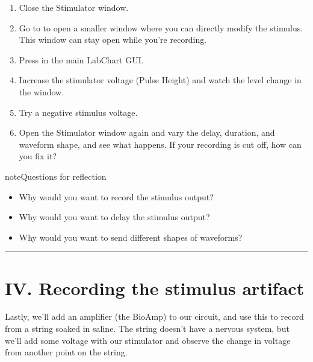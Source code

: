 \documentclass[letterpaper,10pt,english]{jupyterBook}
\begin{document}
\begin{enumerate}
\item {} 
\sphinxAtStartPar
Close the Stimulator window.

\item {} 
\sphinxAtStartPar
Go to  to open a smaller window where you can directly modify the stimulus. This window can stay open while you’re recording.

\item {} 
\sphinxAtStartPar
Press  in the main LabChart GUI.

\item {} 
\sphinxAtStartPar
Increase the stimulator voltage (Pulse Height) and watch the level change in the window.

\item {} 
\sphinxAtStartPar
Try a negative stimulus voltage.

\item {} 
\sphinxAtStartPar
Open the Stimulator window again and vary the delay, duration, and waveform shape, and see what happens. If your recording is cut off, how can you fix it? 

\end{enumerate}

\begin{sphinxadmonition}{note}{Questions for reflection}
\begin{itemize}
\item {} 
\sphinxAtStartPar
Why would you want to record the stimulus output?

\item {} 
\sphinxAtStartPar
Why would you want to delay the stimulus output?

\item {} 
\sphinxAtStartPar
Why would you want to send different shapes of waveforms?

\end{itemize}
\end{sphinxadmonition}


\bigskip\hrule\bigskip



\section{IV. Recording the stimulus artifact}
\label{\detokenize{StringNervousSystems:iv-recording-the-stimulus-artifact}}
\sphinxAtStartPar
Lastly, we’ll add an amplifier (the BioAmp) to our circuit, and use this to record from a string soaked in saline. The string doesn’t have a nervous system, but we’ll add some voltage with our stimulator and observe the change in voltage from another point on the string.
\end{document}
